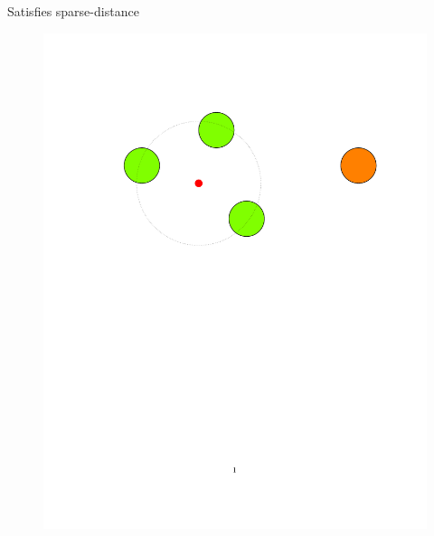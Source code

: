 \documentclass{beamer}
\begin{document}
\begin{frame}{Satisfies sparse-distance}
   \begin{figure}
	  \includegraphics[trim = 100 0 0 100, clip, width=\linewidth]{3.pdf}
   \end{figure}
\end{frame}
\end{document}
